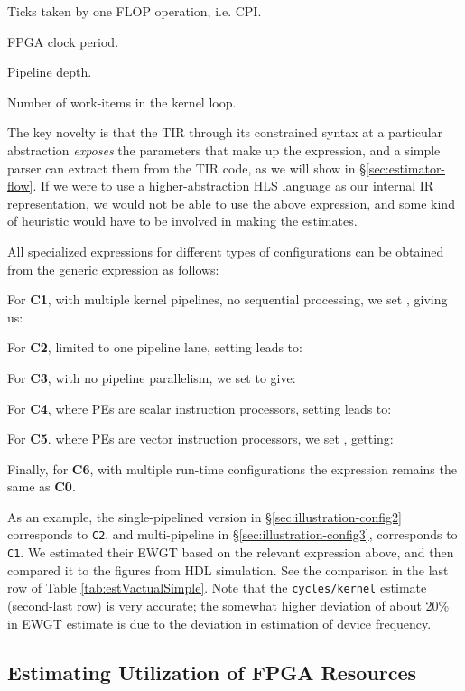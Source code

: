 \documentclass[]{heart2015_WN4Pre}
\begin{document}
{} Ticks taken by one FLOP operation, i.e. CPI.

{} FPGA clock period.

{} Pipeline depth. 

{} Number of work-items in the kernel loop. 

The key novelty is that the TIR through its constrained syntax at a particular abstraction \textit{exposes} the parameters that make up the expression, and a simple parser can extract them from the TIR code, as we will show in \S \ref{sec:estimator-flow}. If we were to use a higher-abstraction HLS language as our internal IR representation, we would not be able to use the above expression, and some kind of heuristic would have to be involved in making the estimates.

All specialized expressions for different types of configurations can be obtained from the generic expression as follows:

For \textbf{C1}, with multiple kernel pipelines, no sequential processing, we set , giving us: 



For \textbf{C2}, limited to one pipeline lane, setting  leads to:


For \textbf{C3}, with no pipeline parallelism, we set  to give:


For \textbf{C4}, where PEs are scalar instruction processors, setting  leads to:


For \textbf{C5}. where PEs are vector instruction processors, we set , getting:


Finally, for \textbf{C6}, with multiple run-time configurations the expression remains the same as \textbf{C0}.

As an example, the single-pipelined version in \S\ref{sec:illustration-config2} corresponds to \texttt{C2}, and multi-pipeline in \S\ref{sec:illustration-config3}, corresponds to \texttt{C1}. We estimated their EWGT based on the relevant expression above, and then compared it to the figures from HDL simulation. See the comparison in the last row of Table \ref{tab:estVactualSimple}. Note that the \texttt{cycles/kernel} estimate (second-last row) is very accurate; the somewhat higher deviation of about 20\% in EWGT estimate is due to the deviation in estimation of device frequency.

\subsection{Estimating Utilization of FPGA Resources}
\end{document}
